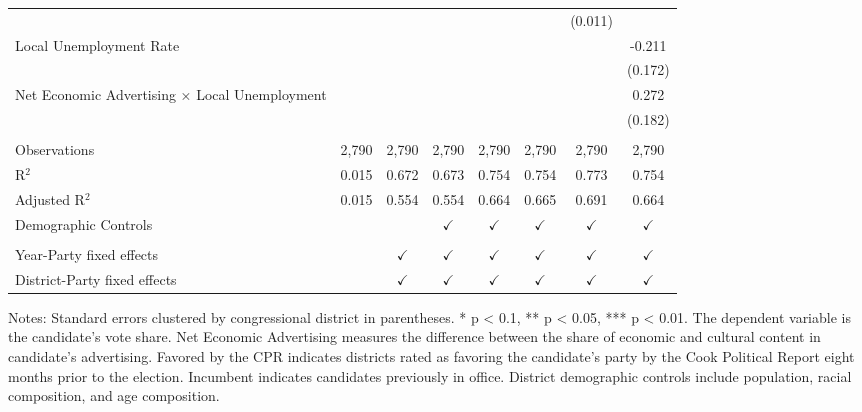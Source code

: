 \begin{table}[htbp]
\begin{tabular}{lccccccc}
                                                    &               &               &               &               &               & (0.011)       &   \\   
      Local Unemployment Rate                       &               &               &               &               &               &               & -0.211\\   
                                                    &               &               &               &               &               &               & (0.172)\\   
      Net Economic Advertising × Local Unemployment &               &               &               &               &               &               & 0.272\\   
                                                    &               &               &               &               &               &               & (0.182)\\   
       \\
      Observations                                  & 2,790         & 2,790         & 2,790         & 2,790         & 2,790         & 2,790         & 2,790\\  
      R$^2$                                         & 0.015         & 0.672         & 0.673         & 0.754         & 0.754         & 0.773         & 0.754\\  
      Adjusted R$^2$                                & 0.015         & 0.554         & 0.554         & 0.664         & 0.665         & 0.691         & 0.664\\  
      Demographic Controls                          &               &               & $\checkmark$  & $\checkmark$  & $\checkmark$  & $\checkmark$  & $\checkmark$\\   
       \\
      Year-Party fixed effects                      &               & $\checkmark$  & $\checkmark$  & $\checkmark$  & $\checkmark$  & $\checkmark$  & $\checkmark$\\   
      District-Party fixed effects                  &               & $\checkmark$  & $\checkmark$  & $\checkmark$  & $\checkmark$  & $\checkmark$  & $\checkmark$\\   
      \bottomrule
   \end{tabular}
   
   \par \raggedright 
   \footnotesize Notes: Standard errors clustered by congressional district in parentheses. * p < 0.1, ** p < 0.05, *** p < 0.01. The dependent variable is the candidate's vote share. Net Economic Advertising measures the difference between the share of economic and cultural content in candidate's advertising. Favored by the CPR indicates districts rated as favoring the candidate's party by the Cook Political Report eight months prior to the election. Incumbent indicates candidates previously in office. District demographic controls include population, racial composition, and age composition.
\end{table}


